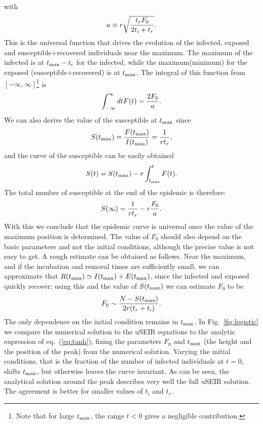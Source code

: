 \documentclass[10pt,letterpaper]{article}
\begin{document}
with
\begin{eqnarray}
a\equiv r \sqrt{{t_r F_0\over 2 t_i+t_r}}.
\label{eq:a}
\end{eqnarray}
This is the universal function that drives the evolution of the infected, exposed and susceptible+recovered individuals near the maximum. The maximum of the infected is at $t_{\rm max}-t_i$ for the infected, while the maximum(minimum) for the exposed (susceptible+recovered) is at $t_{\rm max}$. The integral of this function from $[-\infty, \infty]$\footnote{Note that for large $t_{\rm max}$, the range $t<0$ gives a negligible contribution.} is
\begin{eqnarray}
\int_{-\infty}^{\infty} dt F(t) = {2 F_0 \over a}.
\end{eqnarray}
We can also derive the value of the susceptible at $t_{\rm max}$ since
\begin{eqnarray}
S(t_{\rm max}) = {F(t_{\rm max}) \over I(t_{\rm max})} = {1  \over r t_r},
\end{eqnarray}
and the curve of the susceptible can be easily obtained
\begin{eqnarray}
S(t) = S(t_{\rm max}) - r \int_{t_{\rm max}}^t F(t).
\end{eqnarray}
The total number of susceptible at the end of the epidemic is therefore:
\begin{eqnarray}
S(\infty) = {1\over r t_r } - r {F_0\over a}.
\end{eqnarray}
With this we conclude that the epidemic curve is universal once the value of the maximum position is determined. The value of $F_0$ should also
depend on the basic parameters and not the initial conditions, although
the precise value is not easy to get. A rough estimate can be obtained as follows. Near the maximum, and if the incubation and removal times are sufficiently small, we can approximate that $R(t_{\rm max}) \simeq I(t_{\rm max}) + E(t_{\rm max})$, since the infected and exposed quickly recover; using this and the value of $S(t_{\rm max})$ we can estimate $F_0$ to be
\begin{eqnarray}
F_0 \sim {N-S(t_{\rm max})\over 2 r (t_r +  t_i)}.
\label{eq:rough}
\end{eqnarray}
The only dependence on the initial condition remains in $t_{\rm max}$.
In Fig.~\ref{fig:logistic} we compare the numerical solution to the uSEIR equations to the analytic expression of eq.~(\ref{eq:tanh}), fixing the parameters $F_0$ and $t_{\rm max}$ (the height and the position of the peak) from the numerical solution. Varying the initial conditions, that is the fraction of the number of infected individuals at $t=0$, shifts $t_{\rm max}$, but otherwise leaves the curve invariant. As can be seen, the analytical solution around the peak describes very well the full uSEIR solution. The agreement is better for smaller values of $t_i$ and $t_r$. 
\end{document}

